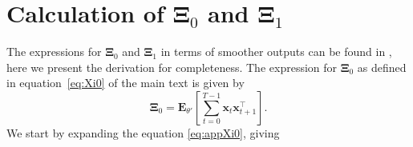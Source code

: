 \documentclass[review,authoryear,3p]{elsarticle}
\begin{document}
\section{Calculation of $\boldsymbol\Xi_{0}$ and $\boldsymbol\Xi_{1}$}\label{ap:Xiderivation}
The expressions for $\boldsymbol\Xi_{0}$ and $\boldsymbol\Xi_{1}$ in terms of smoother outputs can be found in \cite{Shumway2000}, here we present the derivation for completeness.  The expression for  $\boldsymbol\Xi_{0}$ as defined in equation~\eqref{eq:Xi0} of the main text is given by
   \begin{equation}\label{eq:appXi0}
	 \boldsymbol\Xi_0=\mathbf E_{\theta'}\left[\sum_{t=0}^{T-1}\mathbf x_t\mathbf x_{t+1}^\top\right].
	\end{equation}                                                                                                
	We start by expanding the equation \eqref{eq:appXi0}, giving
	
\end{document}
